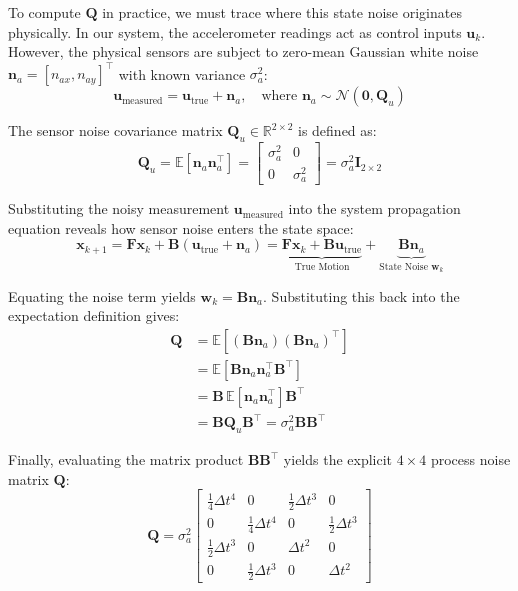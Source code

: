 \documentclass{article}
\begin{document}
	To compute $\mathbf{Q}$ in practice, we must trace where this state noise originates physically. In our system, the accelerometer readings act as control inputs $\mathbf{u}_k$. However, the physical sensors are subject to zero-mean Gaussian white noise $\mathbf{n}_a = [n_{ax}, n_{ay}]^\top$ with known variance $\sigma_a^2$:
	\begin{equation}
		\mathbf{u}_{\text{measured}} = \mathbf{u}_{\text{true}} + \mathbf{n}_a, \quad \text{where } \mathbf{n}_a \sim \mathcal{N}\left(\mathbf{0}, \mathbf{Q}_u\right)
	\end{equation}
	
	The sensor noise covariance matrix $\mathbf{Q}_u \in \mathbb{R}^{2 \times 2}$ is defined as:
	\begin{equation}
		\mathbf{Q}_u = \mathbb{E}\left[\mathbf{n}_a \mathbf{n}_a^\top\right] = 
		\begin{bmatrix}
			\sigma_a^2 & 0 \\
			0 & \sigma_a^2
		\end{bmatrix} = \sigma_a^2 \mathbf{I}_{2 \times 2}
	\end{equation}
	
	Substituting the noisy measurement $\mathbf{u}_{\text{measured}}$ into the system propagation equation reveals how sensor noise enters the state space:
	\begin{equation}
		\mathbf{x}_{k+1} = \mathbf{F}\mathbf{x}_k + \mathbf{B}(\mathbf{u}_{\text{true}} + \mathbf{n}_a) = \underbrace{\mathbf{F}\mathbf{x}_k + \mathbf{B}\mathbf{u}_{\text{true}}}_{\text{True Motion}} + \underbrace{\mathbf{B}\mathbf{n}_a}_{\text{State Noise } \mathbf{w}_k}
	\end{equation}
	
	Equating the noise term yields $\mathbf{w}_k = \mathbf{B}\mathbf{n}_a$. Substituting this back into the expectation definition gives:
	\begin{align}
		\mathbf{Q} &= \mathbb{E}\left[(\mathbf{B}\mathbf{n}_a)(\mathbf{B}\mathbf{n}_a)^\top\right] \nonumber \\
		&= \mathbb{E}\left[\mathbf{B}\mathbf{n}_a \mathbf{n}_a^\top \mathbf{B}^\top\right] \nonumber \\
		&= \mathbf{B} \, \mathbb{E}\left[\mathbf{n}_a \mathbf{n}_a^\top\right] \mathbf{B}^\top \nonumber \\
		&= \mathbf{B} \mathbf{Q}_u \mathbf{B}^\top = \sigma_a^2 \mathbf{B}\mathbf{B}^\top
	\end{align}
	
	Finally, evaluating the matrix product $\mathbf{B}\mathbf{B}^\top$ yields the explicit $4 \times 4$ process noise matrix $\mathbf{Q}$:
	\begin{equation}
		\mathbf{Q} = \sigma_a^2
		\begin{bmatrix}
			\frac{1}{4}\Delta t^4 & 0 & \frac{1}{2}\Delta t^3 & 0 \\
			0 & \frac{1}{4}\Delta t^4 & 0 & \frac{1}{2}\Delta t^3 \\
			\frac{1}{2}\Delta t^3 & 0 & \Delta t^2 & 0 \\
			0 & \frac{1}{2}\Delta t^3 & 0 & \Delta t^2
		\end{bmatrix}
	\end{equation}
\end{document}
